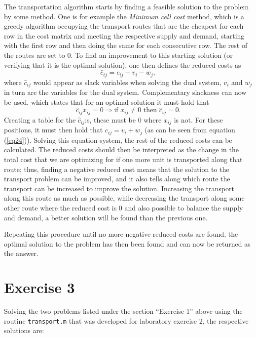 \documentclass{article}
\begin{document}
  \noindent
  The transportation algorithm starts by finding a feasible solution to the problem by some method. One is for example the \textit{Minimum cell cost} method, which is a greedy algorithm occupying the transport routes that are the cheapest for each row in the cost matrix and meeting the respective supply and demand, starting with the first row and then doing the same for each consecutive row. The rest of the routes are set to 0.
  To find an improvement to this starting solution (or verifying that it is the optimal solution), one then defines the reduced costs as
  \begin{equation}
    \hat{c}_{ij} = c_{ij} - v_i - w_j,
    \label{eq24}
  \end{equation}
  where $\hat{c}_{ij}$ would appear as slack variables when solving the dual system, $v_i$ and $w_j$ in turn are the variables for the dual system. Complementary slackness can now be used, which states that for an optimal solution it must hold that
  \begin{equation}
    \hat{c}_{ij}x_{ij} = 0 \Rightarrow \text{if } x_{ij} \neq 0 \text{ then } \hat{c}_{ij} = 0.
  \end{equation}
  Creating a table for the $\hat{c}_{ij}$:s, these must be 0 where $x_{ij}$ is not. For these positions, it must then hold that $c_{ij} = v_i + w_j$ (as can be seen from equation (\ref{eq24})). Solving this equation system, the rest of the reduced costs can be calculated. The reduced costs should then be interpreted as the change in the total cost that we are optimizing for if one more unit is transported along that route; thus, finding a negative reduced cost means that the solution to the transport problem can be improved, and it also tells along which route the transport can be increased to improve the solution. Increasing the transport along this route as much as possible, while decreasing the transport along some other route where the reduced cost is 0 and also possible to balance the supply and demand, a better solution will be found than the previous one.

  Repeating this procedure until no more negative reduced costs are found, the optimal solution to the problem has then been found and can now be returned as the answer.

  \section*{Exercise 3}
  Solving the two problems listed under the section ``Exercise 1'' above using the routine \texttt{transport.m} that was developed for laboratory exercise 2, the respective solutions are:
\end{document}

